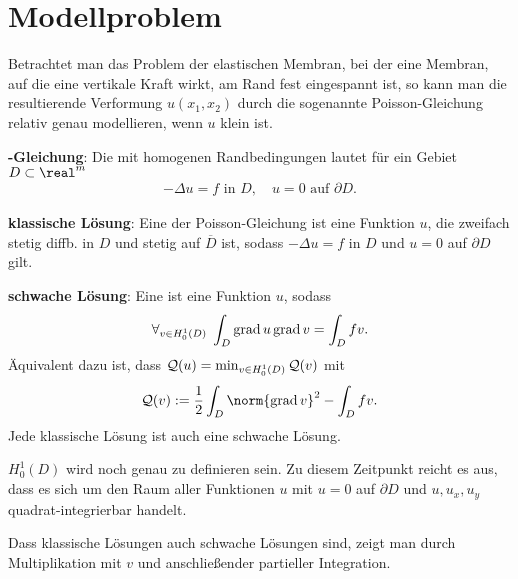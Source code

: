 \section{%
    Modellproblem%
}

Betrachtet man das Problem der elastischen Membran, bei der eine Membran, auf die eine vertikale
Kraft wirkt, am Rand fest eingespannt ist, so kann man die resultierende Verformung $u(x_1, x_2)$
durch die sogenannte Poisson-Gleichung relativ genau modellieren, wenn $u$ klein ist.

\textbf{-Gleichung}:
Die  mit homogenen Randbedingungen lautet
für ein Gebiet $D \subset \real^m$
\begin{align*}
    -\Delta u = f \text{ in } D,\quad
    u = 0 \text{ auf } \partial D.
\end{align*}

\textbf{klassische Lösung}:
Eine  der Poisson-Gleichung ist eine Funktion $u$, die zweifach stetig
diffb. in $D$ und stetig auf $\overline{D}$ ist, sodass $-\Delta u = f$ in $D$ und $u = 0$ auf
$\partial D$ gilt.

\textbf{schwache Lösung}:
Eine  ist eine Funktion $u$, sodass
\begin{align*}
    \forall_{v \in H_0^1(D)}\; \int_D \operatorname{grad} u \operatorname{grad} v = \int_D fv.
\end{align*}
Äquivalent dazu ist, dass $\mathcal{Q}(u) = \min_{v \in H_0^1(D)} \mathcal{Q}(v)$ mit
\begin{align*}
    \Q(v) := \frac{1}{2} \int_D \norm{\grad v}^2 - \int_D fv.
\end{align*}
Jede klassische Lösung ist auch eine schwache Lösung.

$H_0^1(D)$ wird noch genau zu definieren sein.
Zu diesem Zeitpunkt reicht es aus, dass es sich um den Raum aller Funktionen $u$ mit $u = 0$ auf
$\partial D$ und $u, u_x, u_y$ quadrat-integrierbar handelt.

\linie

Dass klassische Lösungen auch schwache Lösungen sind, zeigt man
durch Multiplikation mit $v$ und anschließender partieller Integration.

